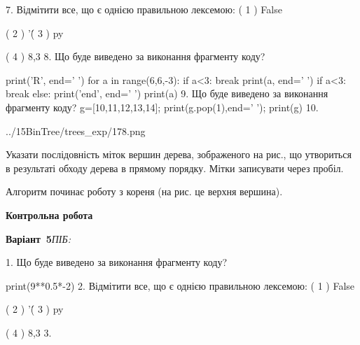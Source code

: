 \documentclass[11pt]{article}
\begin{document}
\vspace{5mm}
7. %
Відмітити все, що є однією правильною лексемою:
( 1 ) False

( 2 ) '\'

( 3 ) py

( 4 ) 8,3
\vspace{5mm}
8. Що буде виведено за виконання фрагменту коду?

print('R', end=' ')
for a in range(6,6,-3):
    if a<3:
        break
        print(a, end=' ')
    if a<3:
        break
    else:
        print('end', end=' ')
    print(a)
\vspace{5mm}
9. Що буде виведено за виконання фрагменту коду?
g=[10,11,12,13,14]; print(g.pop(1),end=' '); print(g)\vspace{5mm}
10. 

\begin{center}
	{../15BinTree/trees_exp/178.png}
\end{center}
Указати послідовність міток вершин дерева, зображеного на рис., що утвориться в результаті обходу дерева в прямому порядку. Мітки записувати через пробіл.\par Алгоритм починає роботу з кореня (на рис. це верхня вершина).
\vspace{5mm}










\newpage

\newpage

{\large\textbf{Контрольна робота}}

\textbf{Варіант \No\,5}\hfill \textit{ПІБ:}\,\underline{\hspace{60mm}}
\vspace{4mm}

1. Що буде виведено за виконання фрагменту коду?

print(9**0.5*-2)
\vspace{5mm}
2. %
Відмітити все, що є однією правильною лексемою:
( 1 ) False

( 2 ) '\'

( 3 ) py

( 4 ) 8,3
\vspace{5mm}
3. 
\end{document}
